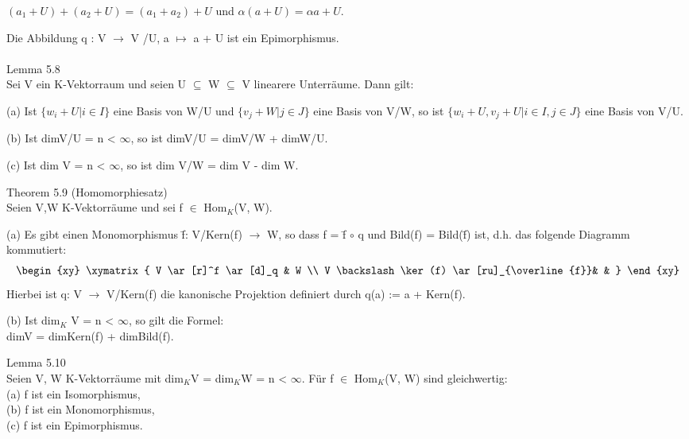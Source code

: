 \begin{center}
$(a_1 + U)+(a_2 + U)=(a_1 +a_2)+U$ und $\alpha(a+U)=\alpha a+U$.
\end{center} 
Die Abbildung q : V $\to$ V /U, a $\mapsto$ a + U ist ein Epimorphismus.\\
\\
Lemma 5.8\\
Sei V ein K-Vektorraum und seien U $\subseteq$ W $\subseteq$ V linearere Unterräume. Dann gilt:
\begin{compactenum}
\item[(a)] Ist $\{w_i + U | i \in I\}$ eine Basis von W/U und $\{v_j + W | j \in J\}$ eine Basis von V/W, so ist $\{w_i +U, v_j +U | i \in I, j \in J\}$ eine Basis von V/U.
\item[(b)] Ist dimV/U = n < $\infty$, so ist dimV/U = dimV/W + dimW/U.
\item[(c)] Ist dim V = n < $\infty$, so ist dim V/W = dim V - dim W.\\
\end{compactenum}
Theorem 5.9 (Homomorphiesatz)\\
Seien V,W K-Vektorräume und sei f $\in$ Hom$_K$(V, W).
\begin{compactenum}
\item[(a)] Es gibt einen Monomorphismus \={f}: V/Kern(f) $\to$ W, so dass f = \={f} $\circ$ q und Bild(f) = Bild(\={f}) ist, d.h. das folgende Diagramm kommutiert:
\begin{align*}
\begin{xy}
  \xymatrix{
      V \ar[r]^f \ar[d]_q &  W \\
      V \backslash \ker(f) \ar[ru]_{\overline{f}}& &
  }
\end{xy}
\end{align*}
Hierbei ist q: V $\to$ V/Kern(f) die kanonische Projektion definiert durch q(a) := a + Kern(f).
\item[(b)] Ist dim$_K$ V = n < $\infty$, so gilt die Formel: \\
dimV = dimKern(f) + dimBild(f).\\
\end{compactenum}
Lemma 5.10\\
Seien V, W K-Vektorräume mit dim$_K$V = dim$_K$W = n < $\infty$. Für f $\in$ Hom$_K$(V, W) sind gleichwertig: \\
(a) f ist ein Isomorphismus, \\
(b) f ist ein Monomorphismus,\\ 
(c) f ist ein Epimorphismus. \\

